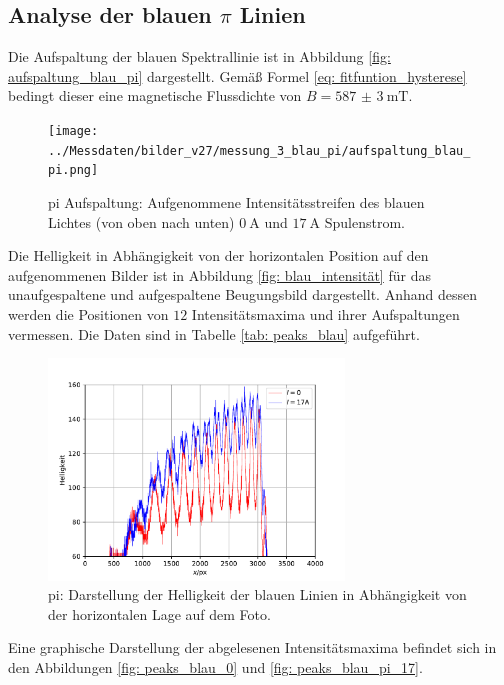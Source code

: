\subsection{Analyse der blauen $\pi$ Linien}
Die Aufspaltung der blauen Spektrallinie ist in Abbildung \ref{fig: aufspaltung_blau_pi} dargestellt. Gemäß Formel \eqref{eq: fitfuntion_hysterese}
bedingt dieser eine magnetische Flussdichte von $B = \SI{587(3)}{\milli\tesla}$.
\begin{figure}
  \centering
  \texttt{[image: ../Messdaten/bilder\_v27/messung\_3\_blau\_pi/aufspaltung\_blau\_pi.png]}
  \caption{pi Aufspaltung: Aufgenommene Intensitätsstreifen des blauen Lichtes (von oben nach unten) $\SI{0}{\ampere}$ und $\SI{17}{\ampere}$ Spulenstrom.}
  \label{fig: aufspaltung_blau}
\end{figure}
Die Helligkeit in Abhängigkeit von der horizontalen Position auf den aufgenommenen Bilder ist in Abbildung \ref{fig: blau_intensität} für das unaufgespaltene
und aufgespaltene Beugungsbild dargestellt. Anhand dessen werden die Positionen von $12$ Intensitätsmaxima und ihrer Aufspaltungen
vermessen. Die Daten sind in Tabelle \ref{tab: peaks_blau} aufgeführt.
\begin{figure}
  \centering
  \includegraphics[width = 0.7\textwidth]{../Messdaten/plots/blau_pi_intensitaet.pdf}
  \caption{pi: Darstellung der Helligkeit der blauen Linien in Abhängigkeit von der horizontalen Lage auf dem Foto.}
  \label{fig: blau_intensität_pi}
\end{figure}

Eine graphische Darstellung der abgelesenen Intensitätsmaxima befindet sich in den Abbildungen \ref{fig: peaks_blau_0} und \ref{fig: peaks_blau_pi_17}.
